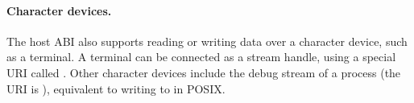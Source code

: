 



\paragraph{Character devices.}
The host ABI also supports reading or writing data over a character device, such as a terminal.
A terminal can be connected as a stream handle,
using a special URI called .
Other character devices include the debug stream of a process (the URI is ),
equivalent to writing to  in POSIX.





